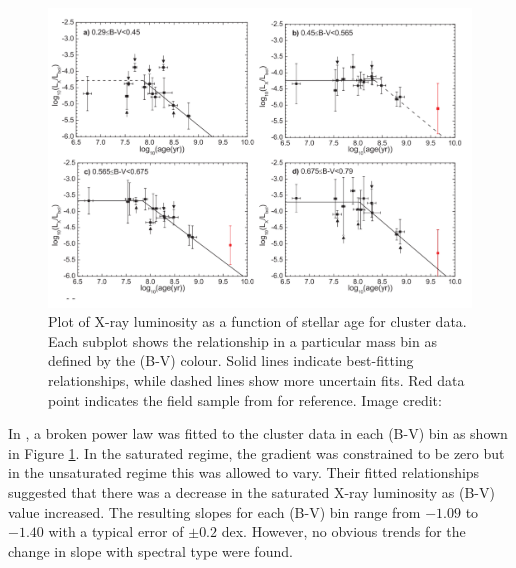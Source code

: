 \begin{figure}
    \centering
    \includegraphics[scale=0.45]{Figures/2-Historical_overview/jackson_etal_2012_part.pdf}
    \caption[\citet{Jackson_etal_2012} X-ray luminosity - age relationship for sample of clusters]{Plot of X-ray luminosity as a function of stellar age for cluster data. Each subplot shows the relationship in a particular mass bin as defined by the (B-V) colour. Solid lines indicate best-fitting relationships, while dashed lines show more uncertain fits. Red data point indicates the field sample from \citet{Pizzolato_etal_2003} for reference. Image credit: \citet{Jackson_etal_2012}}
    \label{fig:jackson_etal_2012_plot}
\end{figure}

In \citet{Jackson_etal_2012}, a broken power law was fitted to the cluster data in each (B-V) bin as shown in Figure \ref{fig:jackson_etal_2012_plot}. In the saturated regime, the gradient was constrained to be zero but in the unsaturated regime this was allowed to vary. Their fitted relationships suggested that there was a decrease in the saturated X-ray luminosity as (B-V) value increased. The resulting slopes for each (B-V) bin range from $-1.09$ to $-1.40$ with a typical error of $\pm 0.2$ dex. However, no obvious trends for the change in slope with spectral type were found.

